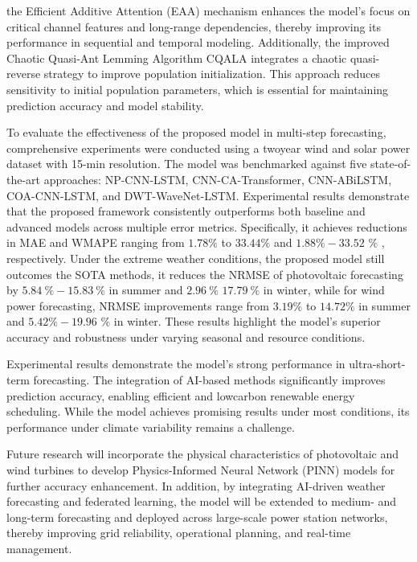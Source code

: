 \documentclass[
  10
]{article}
\begin{document}
the Efficient Additive Attention (EAA) mechanism enhances the model's
focus on critical channel features and long-range dependencies, thereby
improving its performance in sequential and temporal modeling.
Additionally, the improved Chaotic Quasi-Ant Lemming Algorithm CQALA
integrates a chaotic quasi-reverse strategy to improve population
initialization. This approach reduces sensitivity to initial population
parameters, which is essential for maintaining prediction accuracy and
model stability.

To evaluate the effectiveness of the proposed model in multi-step
forecasting, comprehensive experiments were conducted using a twoyear
wind and solar power dataset with 15-min resolution. The model was
benchmarked against five state-of-the-art approaches: NP-CNN-LSTM,
CNN-CA-Transformer, CNN-ABiLSTM, COA-CNN-LSTM, and DWT-WaveNet-LSTM.
Experimental results demonstrate that the proposed framework
consistently outperforms both baseline and advanced models across
multiple error metrics. Specifically, it achieves reductions in MAE and
WMAPE ranging from \(1 . 7 8 \%\) to \(3 3 . 4 4 \%\) and
\(1 . 8 8 \% - 3 3 . 5 2\) \(\%\) , respectively. Under the extreme
weather conditions, the proposed model still outcomes the SOTA methods,
it reduces the NRMSE of photovoltaic forecasting by
\(5 . 8 4 \ \% - 1 5 . 8 3 \ \%\) in summer and \(2 . 9 6 ~ \%\)
\(1 7 . 7 9 \ \%\) in winter, while for wind power forecasting, NRMSE
improvements range from \(3 . 1 9 \%\) to \(1 4 . 7 2 \%\) in summer and
\(5 . 4 2 \% - 1 9 . 9 6\) \(\%\) in winter. These results highlight the
model's superior accuracy and robustness under varying seasonal and
resource conditions.

Experimental results demonstrate the model's strong performance in
ultra-short-term forecasting. The integration of AI-based methods
significantly improves prediction accuracy, enabling efficient and
lowcarbon renewable energy scheduling. While the model achieves
promising results under most conditions, its performance under climate
variability remains a challenge.

Future research will incorporate the physical characteristics of
photovoltaic and wind turbines to develop Physics-Informed Neural
Network (PINN) models for further accuracy enhancement. In addition, by
integrating AI-driven weather forecasting and federated learning, the
model will be extended to medium- and long-term forecasting and deployed
across large-scale power station networks, thereby improving grid
reliability, operational planning, and real-time management.
\end{document}
